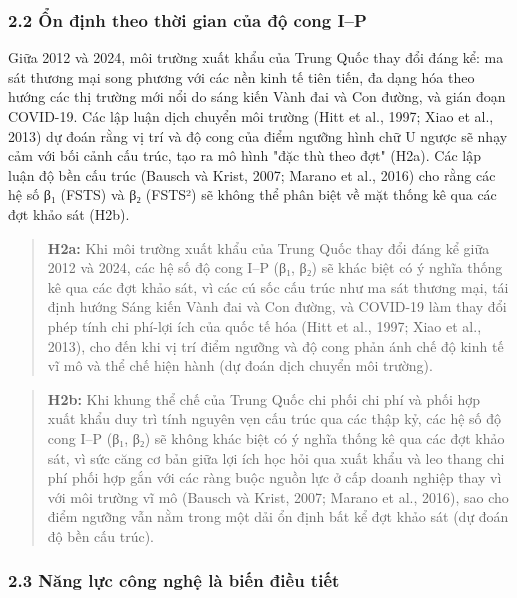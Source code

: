 \documentclass[12pt,a4paper]{article}
\begin{document}
\hypertarget{22-ux1ed5n-ux111ux1ecbnh-theo-thux1eddi-gian-cux1ee7a-ux111ux1ed9-cong-ip}{%
\subsubsection{2.2 Ổn định theo thời gian của độ cong
I--P}\label{22-ux1ed5n-ux111ux1ecbnh-theo-thux1eddi-gian-cux1ee7a-ux111ux1ed9-cong-ip}}

Giữa 2012 và 2024, môi trường xuất khẩu của Trung Quốc thay đổi đáng kể:
ma sát thương mại song phương với các nền kinh tế tiên tiến, đa dạng hóa
theo hướng các thị trường mới nổi do sáng kiến Vành đai và Con đường, và
gián đoạn COVID-19. Các lập luận dịch chuyển môi trường (Hitt et al.,
1997; Xiao et al., 2013) dự đoán rằng vị trí và độ cong của điểm ngưỡng
hình chữ U ngược sẽ nhạy cảm với bối cảnh cấu trúc, tạo ra mô hình "đặc
thù theo đợt" (H2a). Các lập luận độ bền cấu trúc (Bausch và Krist,
2007; Marano et al., 2016) cho rằng các hệ số β₁ (FSTS) và β₂ (FSTS²) sẽ
không thể phân biệt về mặt thống kê qua các đợt khảo sát (H2b).

\begin{quote}
\textbf{H2a:} Khi môi trường xuất khẩu của Trung Quốc thay đổi đáng kể
giữa 2012 và 2024, các hệ số độ cong I--P (β₁, β₂) sẽ khác biệt có ý
nghĩa thống kê qua các đợt khảo sát, vì các cú sốc cấu trúc như ma sát
thương mại, tái định hướng Sáng kiến Vành đai và Con đường, và COVID-19
làm thay đổi phép tính chi phí-lợi ích của quốc tế hóa (Hitt et al.,
1997; Xiao et al., 2013), cho đến khi vị trí điểm ngưỡng và độ cong phản
ánh chế độ kinh tế vĩ mô và thể chế hiện hành (dự đoán dịch chuyển môi
trường).
\end{quote}

\begin{quote}
\textbf{H2b:} Khi khung thể chế của Trung Quốc chi phối chi phí và phối
hợp xuất khẩu duy trì tính nguyên vẹn cấu trúc qua các thập kỷ, các hệ
số độ cong I--P (β₁, β₂) sẽ không khác biệt có ý nghĩa thống kê qua các
đợt khảo sát, vì sức căng cơ bản giữa lợi ích học hỏi qua xuất khẩu và
leo thang chi phí phối hợp gắn với các ràng buộc nguồn lực ở cấp doanh
nghiệp thay vì với môi trường vĩ mô (Bausch và Krist, 2007; Marano et
al., 2016), sao cho điểm ngưỡng vẫn nằm trong một dải ổn định bất kể đợt
khảo sát (dự đoán độ bền cấu trúc).
\end{quote}

\hypertarget{23-nux103ng-lux1ef1c-cuxf4ng-nghux1ec7-luxe0-biux1ebfn-ux111iux1ec1u-tiux1ebft}{%
\subsubsection{2.3 Năng lực công nghệ là biến điều
tiết}\label{23-nux103ng-lux1ef1c-cuxf4ng-nghux1ec7-luxe0-biux1ebfn-ux111iux1ec1u-tiux1ebft}}
\end{document}
